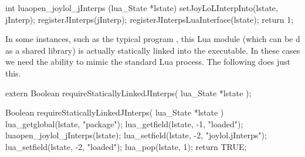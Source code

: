 \startCCode
int luaopen_joylol_jInterps (lua_State *lstate) {
  setJoyLoLInterpInto(lstate, jInterp);
  registerJInterps(jInterp);
  registerJInterpsLuaInterface(lstate);
  return 1;
}
\stopCCode

In some instances, such as the typical  program 
, this Lua module (which can be d as a 
shared library) is actually statically linked into the executable. In 
these cases we need the ability to mimic the standard Lua  
process. The following  does just this. 

\startCHeader
extern Boolean requireStaticallyLinkedJInterps(
  lua_State *lstate
);
\stopCHeader

\startCCode
Boolean requireStaticallyLinkedJInterps(
  lua_State *lstate
) {
  lua_getglobal(lstate, "package");
  lua_getfield(lstate, -1, "loaded");
  luaopen_joylol_jInterps(lstate);
  lua_setfield(lstate, -2, "joylol.jInterps");
  lua_setfield(lstate, -2, "loaded");
  lua_pop(lstate, 1);
  return TRUE;
}
\stopCCode
